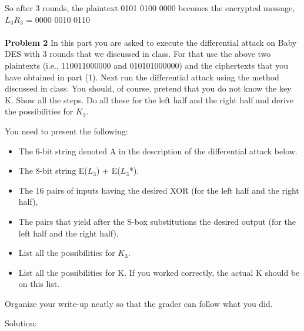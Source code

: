 \documentclass[12pt,letterpaper,final]{report}
\begin{document}
So after 3 rounds, the plaintext 0101 0100 0000 becomes the encrypted message, $L_3R_3$ = 0000 0010 0110 \\
 \\


\bigskip\noindent\textbf{Problem 2} In this part you are asked to execute the differential attack on Baby DES with 3 rounds that we discussed in class. For that use the above two plaintexts  (i.e., 110011000000 and 010101000000) and the ciphertexts that you have obtained in part (1).  Next run the differential attack using the method discussed in class.  You should, of course, pretend that you do not know the key K.  Show all the steps.  Do all these for the left half and the right half and derive the possibilities for $K_3$. 
\bigskip

You need to present the following:

\begin{itemize}
	\item The 6-bit string denoted A in the description of the differential attack below.
	\item The 8-bit string E($L_3$) + E($L_3$*). 
	\item The 16 pairs of inputs having the desired XOR (for the left half and the right half), 
	\item The pairs that yield after the S-box substitutions the desired output (for the left half and the right half),
	\item List all the possibilities for $K_3$.
	\item List all the possibilities for K. If you worked correctly, the actual K should be on this list.
\end{itemize}

Organize your write-up neatly so that the grader can follow what you did.


\bigskip Solution: 
\end{document}

